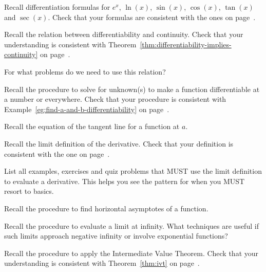 \documentclass[../main.tex]{subfiles}
\begin{document}
\begin{exercise}
  Recall differentiation formulas for \(e^{x}\), \(\ln(x)\), \(\sin(x)\), \(\cos(x)\), \(\tan(x)\) and \(\sec(x)\). Check that your formulas are consistent with the ones on page~\pageref{lesson:differentiation-formulas}.
\end{exercise}

\begin{exercise}
  Recall the relation between differentiability and continuity.
  Check that your understanding is consistent with Theorem~\ref{thm:differentiability-implies-continuity} on page~\pageref{thm:differentiability-implies-continuity}.

  For what problems do we need to use this relation?
\end{exercise}

\begin{exercise}
  Recall the procedure to solve for unknown(s) to make a function differentiable at a number or everywhere. Check that your procedure is consistent with Example~\ref{eg:find-a-and-b-differentiability} on page~\pageref{eg:find-a-and-b-differentiability}.
\end{exercise}

\begin{exercise}
  Recall the equation of the tangent line for a function at \(a\).
\end{exercise}

\begin{exercise}
  Recall the limit definition of the derivative. Check that your definition is consistent with the one on page~\pageref{def:derivative-at-a-point}.

  List all examples, exercises and quiz problems that MUST use the limit definition to evaluate a derivative. This helps you see the pattern for when you MUST resort to basics.
\end{exercise}

\begin{exercise}
  Recall the procedure to find horizontal asymptotes of a function.
\end{exercise}

\begin{exercise}
  Recall the procedure to evaluate a limit at infinity. What techniques are useful if such limits approach negative infinity or involve exponential functions?
\end{exercise}

\begin{exercise}
  Recall the procedure to apply the Intermediate Value Theorem.
  Check that your understanding is consistent with Theorem~\ref{thm:ivt} on page~\pageref{thm:ivt}.
\end{exercise}
\end{document}
